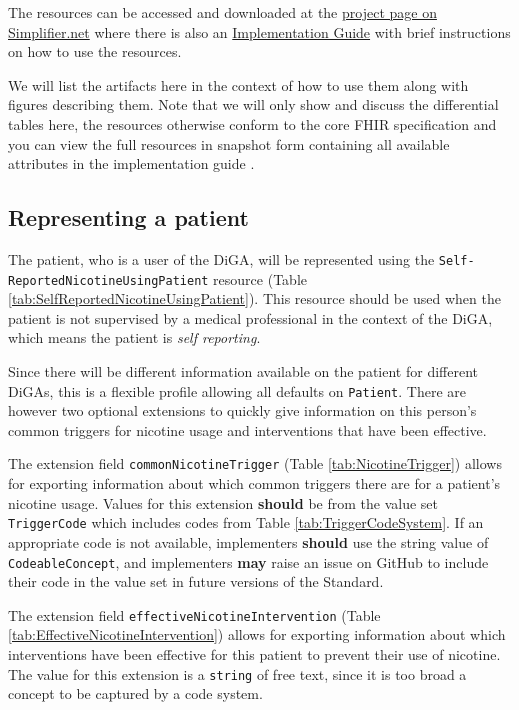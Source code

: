 \documentclass{report}
\def\code#1{\texttt{#1}} %
\newcommand{\tabpatient}{}
\newcommand{\tabtriggerext}{}
\newcommand{\tabinterventionext}{}
\newcommand{\tabtriggercs}{}
\begin{document}
The resources can be accessed and downloaded at the \href{https://simplifier.net/treat-nicotine-usage-diga}{project page on Simplifier.net} where there is also an \href{https://simplifier.net/guide/self-reported-nicotine-usage-diga/home}{Implementation Guide} \cite{ig} with brief instructions on how to use the resources.

We will list the artifacts here in the context of how to use them along with figures describing them. Note that we will only show and discuss the differential tables here, the resources otherwise conform to the core FHIR specification and you can view the full resources in snapshot form containing all available attributes in the implementation guide \cite{ig}.

\subsection{Representing a patient}
\tabpatient
The patient, who is a user of the DiGA, will be represented using the \code{Self-\allowbreak ReportedNicotineUsingPatient} resource (Table \ref{tab:SelfReportedNicotineUsingPatient}). This resource should be used when the patient is not supervised by a medical professional in the context of the DiGA, which means the
patient is \textit{self reporting}.

Since there will be different information available on the patient for different DiGAs, this is a flexible profile allowing all defaults on \code{Patient}. 
There are however two optional extensions to quickly give information on this person's common triggers for nicotine usage and interventions that have been effective.

\tabtriggerext
The extension field \code{commonNicotineTrigger} (Table \ref{tab:NicotineTrigger}) allows for exporting information about which common triggers there are for a patient's nicotine usage. 
Values for this extension \textbf{should} be from the value set \code{TriggerCode} which includes codes from Table \ref{tab:TriggerCodeSystem}. If an appropriate code is not available, implementers \textbf{should} use the string value of \code{CodeableConcept}, 
and implementers \textbf{may} raise an issue on GitHub \cite{github} to include their code in the value set in future versions of the Standard.

\tabtriggercs
\tabinterventionext

The extension field \code{effectiveNicotineIntervention} (Table \ref{tab:EffectiveNicotineIntervention}) allows for exporting information about which interventions have been effective for this patient to prevent their use of nicotine.
The value for this extension is a \code{string} of free text, since it is too broad a concept to be captured by a code system.
\end{document}
